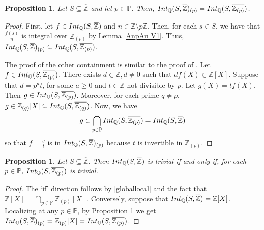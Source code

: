 \documentclass{article}
\newtheorem{Prop}[equation]{Proposition}
\theoremstyle{definition}\newtheorem{Def}[equation]{Definition}
\theoremstyle{definition}\newtheorem{Ques}[equation]{Question}
\theoremstyle{definition}\newtheorem{Conj}[equation]{Conjecture}
\theoremstyle{definition}\newtheorem{Not}[equation]{Notation}
\newcommand{\Q}{\mathbb{Q}}
\newcommand{\oZ}{\overline{\Z}}
\newcommand{\Z}{\mathbb{Z}}
\newcommand{\oQZp}{\overline{\Z_{(p)}}}
\newcommand{\Int}{\textnormal{Int}}
\newcommand{\IntQ}{\Int_{\Q}}
\newcommand{\PP}{\mathbb{P}}
\numberwithin{equation}{section}
\begin{document}
\begin{Prop}\label{localization IntQSZ V1}
Let $S\subseteq\oZ$ and let $p\in\PP$. Then, $\IntQ(S,\oZ)_{(p)}=\IntQ(S,\oQZp)$.
\end{Prop}
\begin{proof}
First, let $f\in \IntQ(S,\oZ)$ and $n\in\Z\setminus p\Z$. Then, for each $s\in S$, we have that $\frac{f(s)}{n}$ is integral over $\Z_{(p)}$ by Lemma \ref{AnpAn V1}. Thus, $\IntQ(S,\oZ)_{(p)} \subseteq \IntQ(S,\oQZp)$.

The proof of the other containment is similar to the proof of \cite[(7)]{ChabPerAdelic}. Let $f\in \IntQ(S,\oQZp)$. There exists $d\in\Z,d\not=0$ such that  $df(X)\in\Z[X]$. Suppose that $d=p^a t$, for some $a\geq0$ and $t\in\Z$ not divisible by $p$. Let $g(X)=t f(X)$. Then $g\in \IntQ(S,\oQZp)$. Moreover, for each prime $q\not=p$, $g\in \Z_{(q)}[X]\subseteq\IntQ(S,\overline{\Z_{(q)}})$. Now, we have
\begin{equation*}
g\in\bigcap_{p\in\PP}\IntQ(S,\oQZp)=\IntQ(S,\oZ)
\end{equation*}
so that $f=\frac{g}{t}$ is in $\IntQ(S,\oZ)_{(p)}$ because $t$ is invertible in $\Z_{(p)}$.
\end{proof}


\begin{Prop}\label{1 iff 2}
Let $S\subseteq\oZ$. Then $\IntQ(S,\oZ)$ is trivial if and only if, for each $p\in\PP$, $\IntQ(S,\oQZp)$ is trivial.
\end{Prop}
\begin{proof}
The `if' direction follows by \eqref{globallocal} and the fact that $\Z[X]=\bigcap_{p\in\PP}\Z_{(p)}[X]$. Conversely, suppose that $\IntQ(S,\oZ)=\Z[X]$. Localizing at any $p\in\PP$, by Proposition \ref{localization IntQSZ V1} we get $\IntQ(S,\oZ)_{(p)}=\Z_{(p)}[X]=\IntQ(S,\oQZp)$.
\end{proof}
\end{document}
